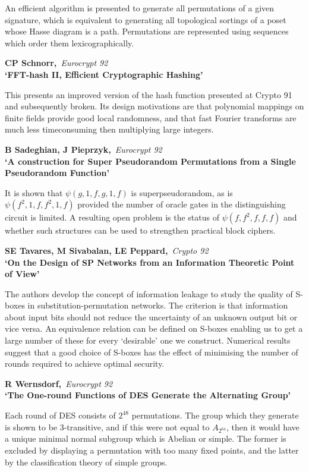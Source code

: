An efficient algorithm is presented to generate all permutations of a given
signature, which is equivalent to generating all topological sortings of a
poset whose Hasse diagram is a path. Permutations are represented using 
sequences which order them lexicographically.

{\bf \noindent CP Schnorr,}{\em ~Eurocrypt 92\\}
{\bf `FFT-hash II, Efficient Cryptographic Hashing'}

This presents an improved version of the hash function presented at Crypto
91 and subsequently broken. Its design motivations are that polynomial
mappings on finite fields provide good local randomness, and that fast
Fourier transforms are much less timeconsuming then multiplying large
integers.

{\bf \noindent B Sadeghian, J Pieprzyk,}{\em ~Eurocrypt 92\\}
{\bf `A construction for Super Pseudorandom Permutations from a Single
Pseudorandom Function'}

It is shown that $\psi(g, 1, f, g, 1, f)$ is superpseudorandom, as is
$\psi(f^2, 1, f, f^2, 1, f)$ provided the number of oracle gates in the
distinguishing circuit is limited. A resulting open problem is the
status of $\psi(f, f^2, f, f, f)$ and whether such structures can be used
to strengthen practical block ciphers.

{\bf \noindent SE Tavares, M Sivabalan, LE Peppard,}{\em ~Crypto 92\\}
{\bf `On the Design of SP Networks from an Information Theoretic Point of 
View'}

The authors develop the concept of information leakage to study the quality of
S-boxes in substitution-permutation networks. The criterion is that
information about input bits should not reduce the uncertainty of an unknown
output bit or vice versa. An equivalence relation can be defined on S-boxes
enabling us to get a large number of these for every `desirable' one we
construct. Numerical results suggest that a good choice of S-boxes has the
effect of minimising the number of rounds required to achieve optimal security.

{\bf \noindent R Wernsdorf,}{\em ~Eurocrypt 92\\}
{\bf `The One-round Functions of DES Generate the Alternating Group'}

Each round of DES consists of $2^{48}$ permutations. The group which they
generate is shown to be 3-transitive, and if this were not equal to
$A_{2^{64}}$, then it would have a unique minimal normal subgroup which is 
Abelian or simple. The former is excluded by displaying a permutation with 
too many fixed points, and the latter by the classification theory of
simple groups.




